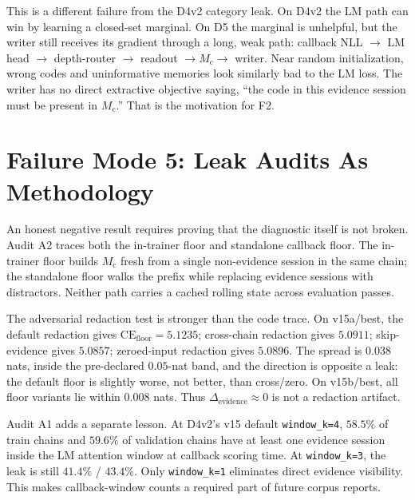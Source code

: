\documentclass{article}
\newcommand{\Mc}{M_{\mathrm{c}}}
\newcommand{\CEfloor}{\mathrm{CE}_{\mathrm{floor}}}
\newcommand{\elift}{\Delta_{\mathrm{evidence}}}
\begin{document}
This is a different failure from the D4v2 category leak.  On D4v2 the
LM path can win by learning a closed-set marginal.  On D5 the marginal
is unhelpful, but the writer still receives its gradient through a
long, weak path: callback NLL $\rightarrow$ LM head $\rightarrow$
depth-router $\rightarrow$ readout $\rightarrow \Mc \rightarrow$ writer.
Near random initialization, wrong codes and uninformative memories look
similarly bad to the LM loss.  The writer has no direct extractive
objective saying, ``the code in this evidence session must be present in
$\Mc$.''  That is the motivation for F2.

\section{Failure Mode 5: Leak Audits As Methodology}

An honest negative result requires proving that the diagnostic itself is
not broken.  Audit A2 traces both the in-trainer floor and standalone
callback floor.  The in-trainer floor builds $\Mc$ fresh from a single
non-evidence session in the same chain; the standalone floor walks the
prefix while replacing evidence sessions with distractors.  Neither
path carries a cached rolling state across evaluation passes.

The adversarial redaction test is stronger than the code trace.  On
v15a/best, the default redaction gives $\CEfloor=5.1235$; cross-chain
redaction gives $5.0911$; skip-evidence gives $5.0857$; zeroed-input
redaction gives $5.0896$.  The spread is $0.038$ nats, inside the
pre-declared $0.05$-nat band, and the direction is opposite a leak:
the default floor is slightly worse, not better, than cross/zero.  On
v15b/best, all floor variants lie within $0.008$ nats.  Thus
$\elift \approx 0$ is not a redaction artifact.

Audit A1 adds a separate lesson.  At D4v2's v15 default
\texttt{window\_k=4}, $58.5\%$ of train chains and $59.6\%$ of
validation chains have at least one evidence session inside the LM
attention window at callback scoring time.  At \texttt{window\_k=3},
the leak is still $41.4\%$ / $43.4\%$.  Only \texttt{window\_k=1}
eliminates direct evidence visibility.  This makes callback-window
counts a required part of future corpus reports.
\end{document}
